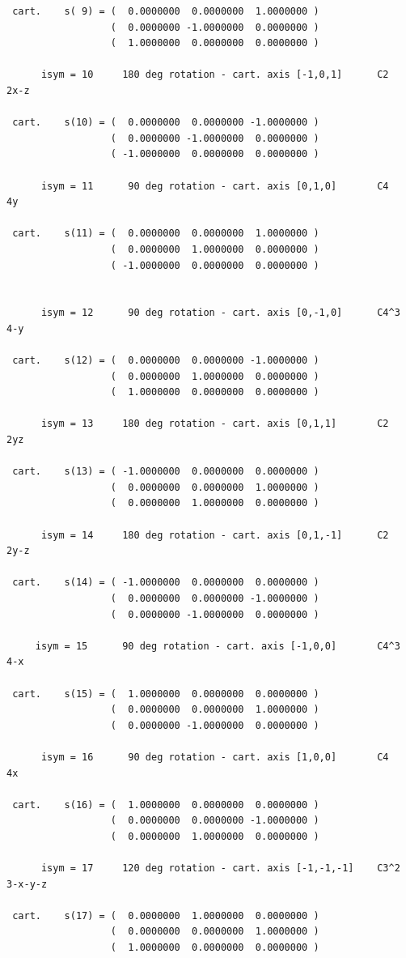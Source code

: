 \documentclass[12pt,a4paper]{article}
\begin{document}
\begin{verbatim}
 cart.    s( 9) = (  0.0000000  0.0000000  1.0000000 )
                  (  0.0000000 -1.0000000  0.0000000 )
                  (  1.0000000  0.0000000  0.0000000 )

      isym = 10     180 deg rotation - cart. axis [-1,0,1]      C2    2x-z

 cart.    s(10) = (  0.0000000  0.0000000 -1.0000000 )
                  (  0.0000000 -1.0000000  0.0000000 )
                  ( -1.0000000  0.0000000  0.0000000 )

      isym = 11      90 deg rotation - cart. axis [0,1,0]       C4    4y

 cart.    s(11) = (  0.0000000  0.0000000  1.0000000 )
                  (  0.0000000  1.0000000  0.0000000 )
                  ( -1.0000000  0.0000000  0.0000000 )


      isym = 12      90 deg rotation - cart. axis [0,-1,0]      C4^3   4-y

 cart.    s(12) = (  0.0000000  0.0000000 -1.0000000 )
                  (  0.0000000  1.0000000  0.0000000 )
                  (  1.0000000  0.0000000  0.0000000 )

      isym = 13     180 deg rotation - cart. axis [0,1,1]       C2     2yz

 cart.    s(13) = ( -1.0000000  0.0000000  0.0000000 )
                  (  0.0000000  0.0000000  1.0000000 )
                  (  0.0000000  1.0000000  0.0000000 )

      isym = 14     180 deg rotation - cart. axis [0,1,-1]      C2     2y-z

 cart.    s(14) = ( -1.0000000  0.0000000  0.0000000 )
                  (  0.0000000  0.0000000 -1.0000000 )
                  (  0.0000000 -1.0000000  0.0000000 )

     isym = 15      90 deg rotation - cart. axis [-1,0,0]       C4^3   4-x

 cart.    s(15) = (  1.0000000  0.0000000  0.0000000 )
                  (  0.0000000  0.0000000  1.0000000 )
                  (  0.0000000 -1.0000000  0.0000000 )

      isym = 16      90 deg rotation - cart. axis [1,0,0]       C4     4x

 cart.    s(16) = (  1.0000000  0.0000000  0.0000000 )
                  (  0.0000000  0.0000000 -1.0000000 )
                  (  0.0000000  1.0000000  0.0000000 )

      isym = 17     120 deg rotation - cart. axis [-1,-1,-1]    C3^2   3-x-y-z

 cart.    s(17) = (  0.0000000  1.0000000  0.0000000 )
                  (  0.0000000  0.0000000  1.0000000 )
                  (  1.0000000  0.0000000  0.0000000 )


\end{verbatim}
\end{document}
